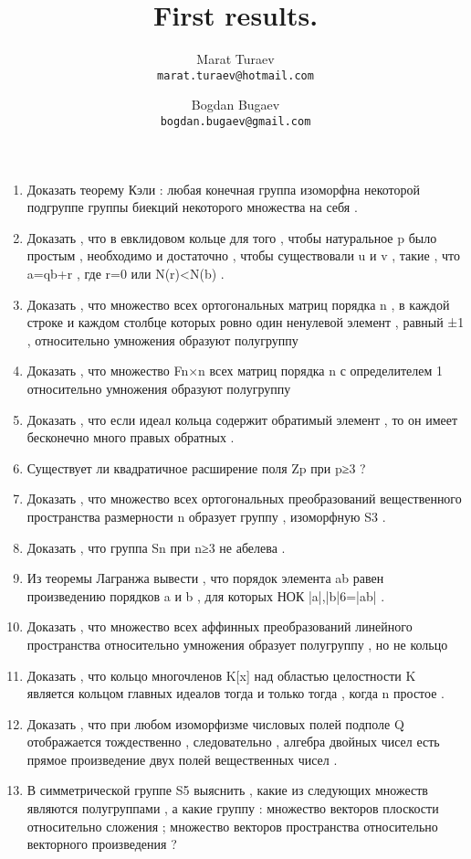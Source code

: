 \documentclass[10pt]{article}
\author{
	Marat Turaev\\
	\texttt{marat.turaev@hotmail.com}
	\and
	Bogdan Bugaev\\
	\texttt{bogdan.bugaev@gmail.com}
}
\begin{document}
\title{First results.}
\maketitle

\begin{enumerate}[1.]
	\item Доказать теорему Кэли : любая конечная группа изоморфна некоторой подгруппе группы биекций некоторого множества на себя .
	\item Доказать , что в евклидовом кольце для того , чтобы натуральное p было простым , необходимо и достаточно , чтобы существовали u и v , такие , что a=qb+r , где r=0 или N(r)<N(b) .
	\item Доказать , что множество всех ортогональных матриц порядка n , в каждой строке и каждом столбце которых ровно один ненулевой элемент , равный ±1 , относительно умножения образуют полугруппу
	\item Доказать , что множество Fn×n всех матриц порядка n с определителем 1 относительно умножения образуют полугруппу
	\item Доказать , что если идеал кольца содержит обратимый элемент , то он имеет бесконечно много правых обратных .
	\item Существует ли квадратичное расширение поля Zp при p≥3 ?
	\item Доказать , что множество всех ортогональных преобразований вещественного пространства размерности n образует группу , изоморфную S3 .
	\item Доказать , что группа Sn при n≥3 не абелева .
	\item Из теоремы Лагранжа вывести , что порядок элемента ab равен произведению порядков a и b , для которых НОК {|a|,|b|}6=|ab| .
	\item Доказать , что множество всех аффинных преобразований линейного пространства относительно умножения образует полугруппу , но не кольцо
	\item Доказать , что кольцо многочленов K[x] над областью целостности K является кольцом главных идеалов тогда и только тогда , когда n простое .
	\item Доказать , что при любом изоморфизме числовых полей подполе Q отображается тождественно , следовательно , алгебра двойных чисел есть прямое произведение двух полей вещественных чисел .
	\item В симметрической группе S5 выяснить , какие из следующих множеств являются полугруппами , а какие группу : множество векторов плоскости относительно сложения ; множество векторов пространства относительно векторного произведения ? 
\end{enumerate}
\end{document}
